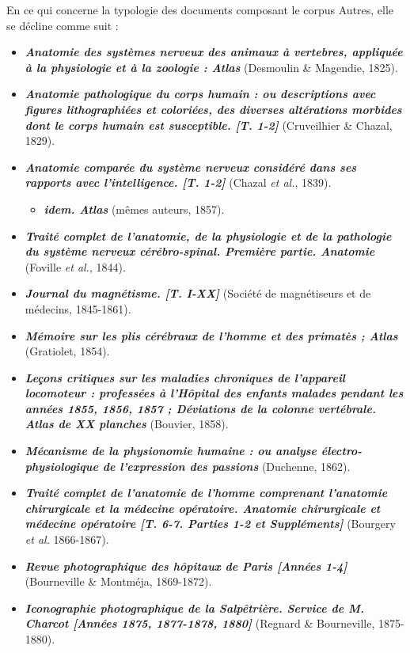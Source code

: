 \bigskip
En ce qui concerne la typologie des documents composant le corpus Autres, elle se décline comme suit :
\begin{itemize}
	\item \textbf{\textit{Anatomie des systèmes nerveux des animaux à vertebres, appliquée à la physiologie et à la zoologie : Atlas}} (Desmoulin \& Magendie, 1825).
	\item \textbf{\textit{Anatomie pathologique du corps humain : ou descriptions avec figures lithographiées et coloriées, des diverses altérations morbides dont le corps humain est susceptible. [T. 1-2]}} (Cruveilhier \& Chazal, 1829).
	\item \textbf{\textit{Anatomie comparée du système nerveux considéré dans ses rapports avec l'intelligence. [T. 1-2]}} (Chazal \textit{et al.}, 1839).
	\begin{itemize}
		\item \textit{\textbf{idem. Atlas}} (mêmes auteurs, 1857).
	\end{itemize}
	\item \textbf{\textit{Traité complet de l'anatomie, de la physiologie et de la pathologie du système nerveux cérébro-spinal. Première partie. Anatomie}} (Foville \textit{et al.}, 1844).
	\item \textbf{\textit{Journal du magnétisme. [T. I-XX]}} (Société de magnétiseurs et de médecins, 1845-1861).
	\item \textbf{\textit{Mémoire sur les plis cérébraux de l'homme et des primatès ; Atlas}} (Gratiolet, 1854).
	\item \textbf{\textit{Leçons critiques sur les maladies chroniques de l'appareil locomoteur : professées à l'Hôpital des enfants malades pendant les années 1855, 1856, 1857 ; Déviations de la colonne vertébrale. Atlas de XX planches}} (Bouvier, 1858).
	\item \textbf{\textit{Mécanisme de la physionomie humaine : ou analyse électro-physiologique de l'expression des passions}} (Duchenne, 1862).
	\item \textbf{\textit{Traité complet de l'anatomie de l'homme comprenant l'anatomie chirurgicale et la médecine opératoire. Anatomie chirurgicale et médecine opératoire [T. 6-7. Parties 1-2 et Suppléments]}} (Bourgery \textit{et al.} 1866-1867).
	\item \textbf{\textit{Revue photographique des hôpitaux de Paris [Années 1-4]}} (Bourneville \& Montméja, 1869-1872).
	\item \textbf{\textit{Iconographie photographique de la Salpêtrière. Service de M. Charcot [Années 1875, 1877-1878, 1880]}} (Regnard \& Bourneville, 1875-1880).

\end{itemize}

